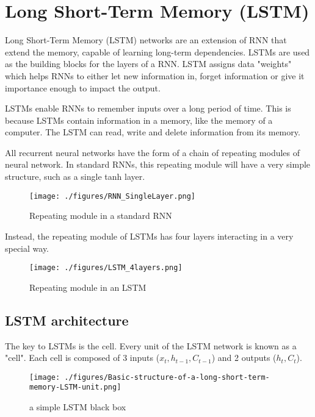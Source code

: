 \section{Long Short-Term Memory (LSTM)}
Long Short-Term Memory (LSTM) networks are an extension of RNN that extend the memory, capable of learning long-term dependencies. LSTMs are used as the building blocks for the layers of a RNN. LSTM assigns data "weights" which helps RNNs to either let new information in, forget information or give it importance enough to impact the output.

LSTMs enable RNNs to remember inputs over a long period of time. This is because LSTMs contain information in a memory, like the memory of a computer. The LSTM can read, write and delete information from its memory.

All recurrent neural networks have the form of a chain of repeating modules of neural network. In standard RNNs, this repeating module will have a very simple structure, such as a single tanh layer.

\begin{figure}[h]
	\centering
	\texttt{[image: ./figures/RNN\_SingleLayer.png]}
	\caption{Repeating module in a standard RNN}
\end{figure}
Instead, the repeating module of LSTMs has four layers interacting in a very special way. 

\begin{figure}[h]
	\centering
	\texttt{[image: ./figures/LSTM\_4layers.png]}
	\caption{Repeating module in an LSTM}
\end{figure}

\subsection{LSTM architecture}
The key to LSTMs is the cell. Every unit of the LSTM network is known as a "cell". Each cell is composed of 3 inputs ($x_t, h_{t-1}, C_{t-1}$) and 2 outputs ($h_t, C_t$).

\begin{figure}[h]
	\centering
	\texttt{[image: ./figures/Basic-structure-of-a-long-short-term-memory-LSTM-unit.png]}	
	\caption{a simple LSTM black box}
\end{figure}

%


